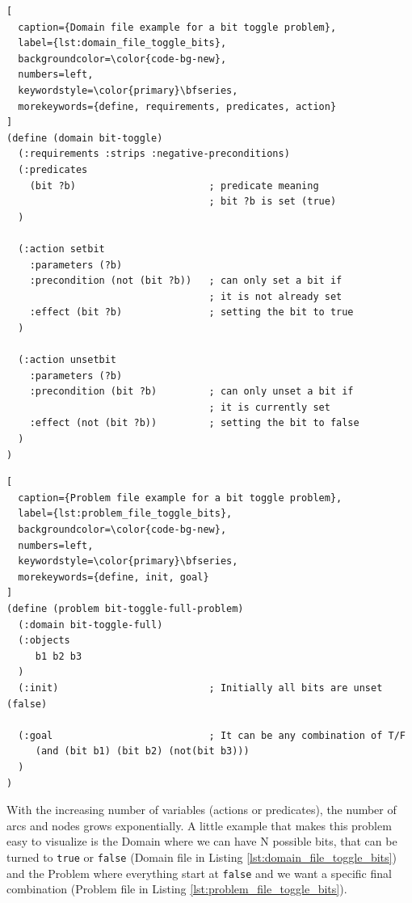 \begin{lstlisting}[
  caption={Domain file example for a bit toggle problem},
  label={lst:domain_file_toggle_bits},
  backgroundcolor=\color{code-bg-new},
  numbers=left,
  keywordstyle=\color{primary}\bfseries,
  morekeywords={define, requirements, predicates, action}
]
(define (domain bit-toggle)
  (:requirements :strips :negative-preconditions)
  (:predicates
    (bit ?b)                       ; predicate meaning
                                   ; bit ?b is set (true)
  )

  (:action setbit
    :parameters (?b)
    :precondition (not (bit ?b))   ; can only set a bit if
                                   ; it is not already set
    :effect (bit ?b)               ; setting the bit to true
  )

  (:action unsetbit
    :parameters (?b)
    :precondition (bit ?b)         ; can only unset a bit if
                                   ; it is currently set
    :effect (not (bit ?b))         ; setting the bit to false
  )
)
\end{lstlisting}

\begin{lstlisting}[
  caption={Problem file example for a bit toggle problem},
  label={lst:problem_file_toggle_bits},
  backgroundcolor=\color{code-bg-new},
  numbers=left,
  keywordstyle=\color{primary}\bfseries,
  morekeywords={define, init, goal}
]
(define (problem bit-toggle-full-problem)
  (:domain bit-toggle-full)
  (:objects
     b1 b2 b3
  )
  (:init)                          ; Initially all bits are unset (false)

  (:goal                           ; It can be any combination of T/F
     (and (bit b1) (bit b2) (not(bit b3)))
  )
)
\end{lstlisting}

With the increasing number of variables (actions or predicates), the number of arcs
and nodes grows exponentially. A little example that makes this problem easy to
visualize is the Domain where we can have N possible bits, that can be turned to
\texttt{true} or \texttt{false} (Domain file in Listing
\ref{lst:domain_file_toggle_bits}) and the Problem where everything start at \texttt{false}
and we want a specific final combination (Problem file in Listing \ref{lst:problem_file_toggle_bits}).

